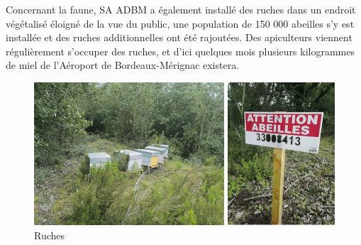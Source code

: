 Concernant la faune, SA ADBM a également installé des ruches dans un endroit végétalisé éloigné de la vue du public, une population de 150 000 abeilles s'y est installée et des ruches additionnelles ont été rajoutées. Des apiculteurs viennent régulièrement s'occuper des ruches, et d'ici quelques mois plusieurs kilogrammes de miel de l'Aéroport de Bordeaux-Mérignac existera.

 \begin{figure}[hbt!]
   \centering
   \includegraphics[width=14cm]{Images/ruches.jpg}
   \caption{Ruches}
   \label{fig:abeilles}
 \end{figure}

